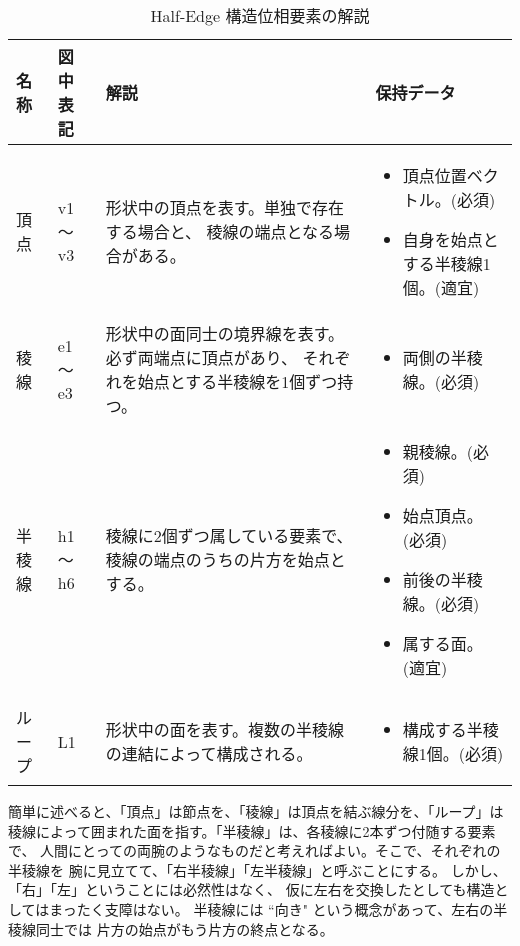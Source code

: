 \begin{table}[H]
\caption{Half-Edge 構造位相要素の解説}
\label{tbl:HalfEdge1}
\begin{center}
\begin{tabular}{|l|l|p{6cm}|p{6cm}|}
\hline
名称 & 図中表記 & 解説 & 保持データ \\ \hline \hline
頂点 & v1 〜 v3 &
	形状中の頂点を表す。単独で存在する場合と、
	稜線の端点となる場合がある。&
	\vspace*{-5mm}
	\begin{itemize}
	 \item 頂点位置ベクトル。(必須)
	 \item 自身を始点とする半稜線1個。(適宜)
	\end{itemize} \\ \hline
稜線 & e1 〜 e3 &
	形状中の面同士の境界線を表す。必ず両端点に頂点があり、
	それぞれを始点とする半稜線を1個ずつ持つ。&
	\vspace*{-5mm}
	\begin{itemize}
	 \item 両側の半稜線。(必須)
	\end{itemize} \\ \hline
半稜線 & h1 〜 h6 &
	稜線に2個ずつ属している要素で、稜線の端点のうちの片方を始点とする。&
	\vspace*{-5mm}
	\begin{itemize}
	 \item 親稜線。(必須)
	 \item 始点頂点。(必須)
	 \item 前後の半稜線。(必須)
	 \item 属する面。(適宜)
	\end{itemize} \\ \hline
ループ & L1 &
	形状中の面を表す。複数の半稜線の連結によって構成される。&
	\vspace*{-5mm}
	\begin{itemize}
	 \item 構成する半稜線1個。(必須)
	\end{itemize} \\ \hline
\end{tabular}
\end{center}
\end{table}
簡単に述べると、「頂点」は節点を、「稜線」は頂点を結ぶ線分を、「ループ」は
稜線によって囲まれた面を指す。「半稜線」は、各稜線に2本ずつ付随する要素で、
人間にとっての両腕のようなものだと考えればよい。そこで、それぞれの半稜線を
腕に見立てて、「右半稜線」「左半稜線」と呼ぶことにする。
しかし、「右」「左」ということには必然性はなく、
仮に左右を交換したとしても構造としてはまったく支障はない。
半稜線には ``向き" という概念があって、左右の半稜線同士では
片方の始点がもう片方の終点となる。

